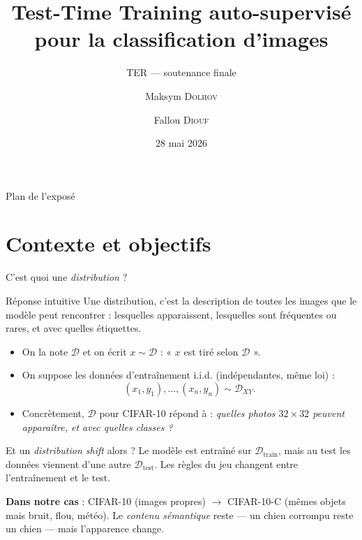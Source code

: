\documentclass[10pt,aspectratio=169]{beamer}
\title[TTT auto-supervisé]{Test-Time Training auto-supervisé\\pour la classification d'images}
\subtitle{TER --- soutenance finale}
\author[Dolhov \& Diouf]{Maksym \textsc{Dolhov} \and Fallou \textsc{Diouf}}
\institute[U.~Paris]{Université Paris Cité --- Master 1 Vision et Machine Intelligente}
\date{28 mai 2026}
\begin{document}
\begin{frame}[plain]
  \titlepage
\end{frame}

\begin{frame}{Plan de l'exposé}
  \tableofcontents
\end{frame}

\section{Contexte et objectifs}

\begin{frame}{C'est quoi une \emph{distribution} ?}
  \begin{block}{Réponse intuitive}
    Une distribution, c'est la \alert{description de toutes les images que le modèle peut rencontrer} : lesquelles apparaissent, lesquelles sont fréquentes ou rares, et avec quelles étiquettes.
  \end{block}

  \begin{itemize}
    \item On la note $\mathcal{D}$ et on écrit $x \sim \mathcal{D}$ : « $x$ est tiré selon $\mathcal{D}$ ».
    \item On suppose les données d'entraînement \alert{i.i.d.} (indépendantes, même loi) :
    \[ (x_1, y_1), \dots, (x_n, y_n) \sim \mathcal{D}_{XY}. \]
    \item Concrètement, $\mathcal{D}$ pour CIFAR-10 répond à : \emph{quelles photos $32{\times}32$ peuvent apparaître, et avec quelles classes ?}
  \end{itemize}

  \vspace{0.4em}
  \begin{block}{Et un \emph{distribution shift} alors ?}
    Le modèle est entraîné sur $\mathcal{D}_{\text{train}}$, mais au test les données viennent d'une autre $\mathcal{D}_{\text{test}}$. \alert{Les règles du jeu changent entre l'entraînement et le test.}
  \end{block}

  \textbf{Dans notre cas} : CIFAR-10 (images propres) $\rightarrow$ CIFAR-10-C (mêmes objets mais bruit, flou, météo). Le \emph{contenu sémantique} reste --- un chien corrompu reste un chien --- mais l'apparence change.
\end{frame}
\end{document}

